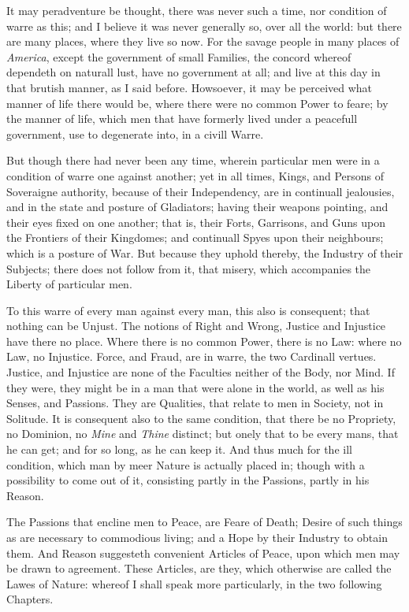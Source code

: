 It may peradventure be thought, there was never such a time, nor
condition of warre as this; and I believe it was never generally so,
over all the world: but there are many places, where they live so now.
For the savage people in many places of \textit{America}, except the
government of small Families, the concord whereof dependeth on
naturall lust, have no government at all; and live at this day in that
brutish manner, as I said before. Howsoever, it may be perceived what
manner of life there would be, where there were no common Power to
feare; by the manner of life, which men that have formerly lived under
a peacefull government, use to degenerate into, in a civill Warre.

But though there had never been any time, wherein particular men were
in a condition of warre one against another; yet in all times, Kings,
and Persons of Soveraigne authority, because of their Independency,
are in continuall jealousies, and in the state and posture of
Gladiators; having their weapons pointing, and their eyes fixed on one
another; that is, their Forts, Garrisons, and Guns upon the Frontiers
of their Kingdomes; and continuall Spyes upon their neighbours; which
is a posture of War. But because they uphold thereby, the Industry of
their Subjects; there does not follow from it, that misery, which
accompanies the Liberty of particular men.

To this warre of every man against every man, this also is consequent;
that nothing can be Unjust. The notions of Right and Wrong, Justice
and Injustice have there no place. Where there is no common Power,
there is no Law: where no Law, no Injustice. Force, and Fraud, are in
warre, the two Cardinall vertues. Justice, and Injustice are none of
the Faculties neither of the Body, nor Mind. If they were, they might
be in a man that were alone in the world, as well as his Senses, and
Passions. They are Qualities, that relate to men in Society, not in
Solitude. It is consequent also to the same condition, that there be
no Propriety, no Dominion, no \textit{Mine} and \textit{Thine}
distinct; but onely that to be every mans, that he can get; and for so
long, as he can keep it. And thus much for the ill condition, which
man by meer Nature is actually  placed in; though with a
possibility to come out of it, consisting partly in the Passions,
partly in his Reason.

The Passions that encline men to Peace, are Feare of Death; Desire of
such things as are necessary to commodious living; and a Hope by their
Industry to obtain them. And Reason suggesteth convenient Articles of
Peace, upon which men may be drawn to agreement. These Articles, are
they, which otherwise are called the Lawes of Nature: whereof I shall
speak more particularly, in the two following Chapters.

